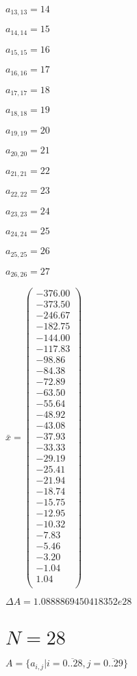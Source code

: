 \documentclass[a4paper,12pt]{article}
\begin{document}
$a _{ 13, 13 } = 14$

$a _{ 14, 14 } = 15$

$a _{ 15, 15 } = 16$

$a _{ 16, 16 } = 17$

$a _{ 17, 17 } = 18$

$a _{ 18, 18 } = 19$

$a _{ 19, 19 } = 20$

$a _{ 20, 20 } = 21$

$a _{ 21, 21 } = 22$

$a _{ 22, 22 } = 23$

$a _{ 23, 23 } = 24$

$a _{ 24, 24 } = 25$

$a _{ 25, 25 } = 26$

$a _{ 26, 26 } = 27$

$\bar { x } = \begin{pmatrix}
-376.00 \\
-373.50 \\
-246.67 \\
-182.75 \\
-144.00 \\
-117.83 \\
-98.86 \\
-84.38 \\
-72.89 \\
-63.50 \\
-55.64 \\
-48.92 \\
-43.08 \\
-37.93 \\
-33.33 \\
-29.19 \\
-25.41 \\
-21.94 \\
-18.74 \\
-15.75 \\
-12.95 \\
-10.32 \\
-7.83 \\
-5.46 \\
-3.20 \\
-1.04 \\
1.04 \\
\end{pmatrix}
$

$\Delta A = 1.0888869450418352e28$



\section{ $N = 28$ }
$A = \{ a _{ i, j } | i = \overline { 0..28 }, j = \overline { 0..29 } \}$
\end{document}
